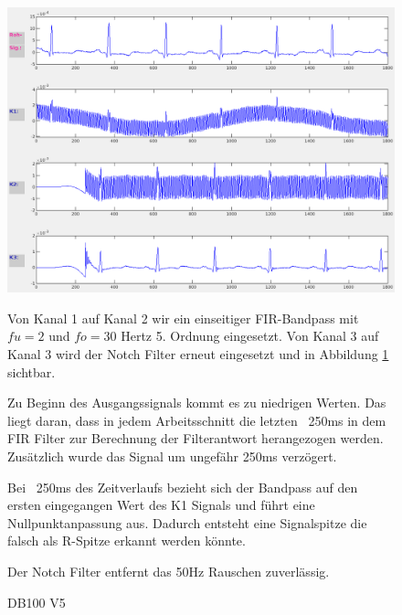 \documentclass[a4paper,12pt,titlepage]{scrartcl}
\begin{document}
\begin{figure}[ht]
    \begin{minipage}[t]{0.5\linewidth}
        \centering
        \includegraphics[width=0.9\linewidth, valign=t]{Assets/LaborBMT-15-50-45.png}
        \caption{DB100 V5}
        \label{db100v5}
    \end{minipage}%
    \begin{minipage}[t]{0.5\linewidth}
        Von Kanal 1 auf Kanal 2 wir ein einseitiger FIR-Bandpass mit $fu=2$ und $fo=30$ Hertz 5. Ordnung eingesetzt.
        Von Kanal 3 auf Kanal 3 wird der Notch Filter erneut eingesetzt und in Abbildung \ref{db100v5} sichtbar.

        Zu Beginn des Ausgangssignals kommt es zu niedrigen Werten. Das liegt daran, dass in jedem Arbeitsschnitt die letzten ~250ms in dem FIR Filter zur Berechnung der Filterantwort herangezogen werden.
        Zusätzlich wurde das Signal um ungefähr 250ms verzögert.

        Bei ~250ms des Zeitverlaufs bezieht sich der Bandpass auf den ersten eingegangen Wert des K1 Signals und führt eine Nullpunktanpassung aus. Dadurch entsteht eine Signalspitze die falsch als R-Spitze erkannt werden könnte.

        Der Notch Filter entfernt das 50Hz Rauschen zuverlässig.
    \end{minipage}
\end{figure}
\end{document}
